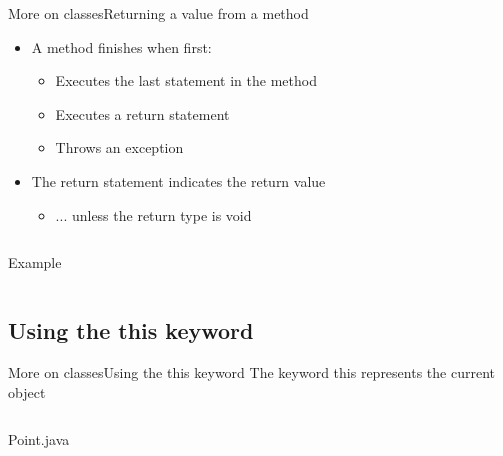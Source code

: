 \documentclass[10pt,compress]{beamer} %
\begin{document}
\begin{frame}[shrink]{More on classes}{Returning a value from a method}
	\begin{itemize}
	\item A method finishes when first:
	\begin{itemize}
		\item Executes the last statement in the method
		\item Executes a \alert{return} statement
		\item Throws an exception
	\end{itemize}
	\item The return statement indicates the return value
		\begin{itemize}
		\item ... unless the return type is \alert{void}
		\end{itemize}
	\end{itemize}
	\begin{columns}
	\vspace{-0.3cm}
	\begin{block}{Example}
		\vspace{-0.2cm}
		
		\vspace{-0.2cm}
	\end{block}
	\end{columns}

\end{frame}

\subsection{Using the this keyword}

\begin{frame}[shrink]{More on classes}{Using the this keyword}
	The keyword \alert{this} represents the current object

	\begin{columns}
	\vspace{-0.2cm}
	\begin{block}{Point.java}
		\vspace{-0.2cm}
		
		\vspace{-0.2cm}
	\end{block}
	\end{columns}
\end{frame}
\end{document}
